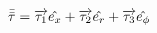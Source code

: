 \begin{equation}
  \bar{\bar{\tau}} 
  = \overrightarrow{\tau_1}\hat{e_x} 
  + \overrightarrow{\tau_2}\hat{e_r}
  + \overrightarrow{\tau_3}\hat{e_\phi}
\end{equation}

